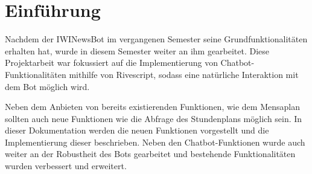 \chapter{Einführung}

Nachdem der IWINewsBot im vergangenen Semester seine Grundfunktionalitäten erhalten hat, wurde in diesem Semester weiter an ihm gearbeitet. Diese Projektarbeit war fokussiert auf die Implementierung von Chatbot-Funktionalitäten mithilfe von Rivescript, sodass eine natürliche Interaktion mit dem Bot möglich wird. 

Neben dem Anbieten von bereits existierenden Funktionen, wie dem Mensaplan sollten auch neue Funktionen wie die Abfrage des Stundenplans möglich sein.
In dieser Dokumentation werden die neuen Funktionen vorgestellt und die Implementierung dieser beschrieben. Neben den Chatbot-Funktionen wurde auch weiter an der Robustheit des Bots gearbeitet und bestehende Funktionalitäten wurden verbessert und erweitert.